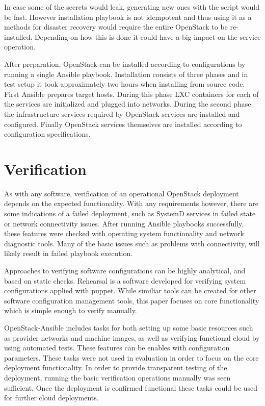 In case some of the secrets would leak, generating new ones with the script
would be fast. However installation playbook is not idempotent and thus using
it as a methods for disaster recovery would require the entire OpenStack to be
re-installed. Depending on how this is done it could have a big impact on the
service operation.

After preparation, OpenStack can be installed according to configurations by
running a single Ansible playbook. Installation consists of three phases and
in test setup it took approximately two hours when installing from source code.
First Ansible prepares target hosts. During this phase LXC containers for each
of the services are initialized and plugged into networks. During the second
phase the infrastructure services required by OpenStack services are installed
and configured. Finally OpenStack services themselves are installed according
to configuration specifications.

\section{Verification}

As with any software, verification of an operational OpenStack deployment
depends on the expected functionality. With any requirements however, there are
some indications of a failed deployment, such as SystemD services in failed
state or network connectivity issues. After running Ansible playbooks
successfully, these features were checked with operating system functionality
and network diagnostic tools. Many of the basic issues such as problems with
connectivity, will likely result in failed playbook execution.

Approaches to verifying software configurations can be highly analytical, and
based on static checks. Rehearsal \cite{rehearsal} is a software developed for
verifying system configurations applied with puppet. While similiar tools can
be created for other software configuration management tools, this paper
focuses on core functionality which is simple enough to verify manually.

OpenStack-Ansible includes tasks for both setting up some basic resources such
as provider networks and machine images, as well as verifying functional cloud
by using automated tests. These features can be enables with configuration
parameters. These tasks were not used in evaluation in order to focus on the
core deployment functionality. In order to provide transparent testing of the
deployment, running the basic verification operations manually was seen
sufficient. Once the deployment is confirmed functional these tasks could
be used for further cloud deployments.

